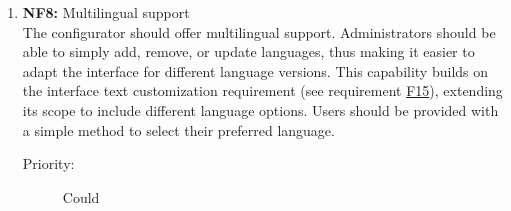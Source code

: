 \begin{enumerate}
\item \textbf{NF8:} \label{itm:NF8} Multilingual support
\vspace{2pt}
\\The configurator should offer multilingual support. Administrators should be able to simply add, remove, or update languages, thus making it easier to adapt the interface for different language versions. This capability builds on the interface text customization requirement (see requirement \hyperref[itm:F15]{F15}), extending its scope to include different language options. Users should be provided with a simple method to select their preferred language.
\begin{description}
    \item[Priority:] Could
\end{description}
\vspace{4pt}

\end{enumerate}